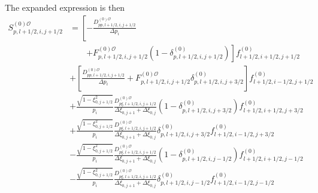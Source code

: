 \begin{itemize}
The expanded expression is then
\begin{align}
S_{p,l+1/2,i,j+1/2}^{\left(  0\right)  \mathcal{O}} &  =\left[  -\frac
{D_{pp,l+1/2,i,j+1/2}^{(0)\mathcal{O}}}{\Delta p_{i}}\right.\nonumber\\&\qquad\left.+F_{p,l+1/2,i,j+1/2}%
^{(0)\mathcal{O}}\left(  1-\delta_{p,l+1/2,i,j+1/2}^{\left(  0\right)
}\right)  \right]  f_{l+1/2,i+1/2,j+1/2}^{\left(  0\right)  }\label{sp0dis}\\
&  +\left[  \frac{D_{pp,l+1/2,i,j+1/2}^{(0)\mathcal{O}}}{\Delta p_{i}%
}+F_{p,l+1/2,i,j+1/2}^{(0)\mathcal{O}}\delta_{p,l+1/2,i,j+3/2}^{\left(
0\right)  }\right]  f_{l+1/2,i-1/2,j+1/2}^{\left(  0\right)  }\nonumber\\
&  +\frac{\sqrt{1-\xi_{0,j+1/2}^{2}}}{p_{i}}\frac{D_{p\xi,l+1/2,i,j+1/2}%
^{(0)\mathcal{O}}}{\Delta\xi_{0,j+1}+\Delta\xi_{0,j}}\left(  1-\delta
_{p,l+1/2,i,j+3/2}^{\left(  0\right)  }\right)  f_{l+1/2,i+1/2,j+3/2}^{\left(
0\right)  }\nonumber\\
&  +\frac{\sqrt{1-\xi_{0,j+1/2}^{2}}}{p_{i}}\frac{D_{p\xi,l+1/2,i,j+1/2}%
^{(0)\mathcal{O}}}{\Delta\xi_{0,j+1}+\Delta\xi_{0,j}}\delta_{p,l+1/2,i,j+3/2}%
^{\left(  0\right)  }f_{l+1/2,i-1/2,j+3/2}^{\left(  0\right)  }\nonumber\\
&  -\frac{\sqrt{1-\xi_{0,j+1/2}^{2}}}{p_{i}}\frac{D_{p\xi,l+1/2,i,j+1/2}%
^{(0)\mathcal{O}}}{\Delta\xi_{0,j+1}+\Delta\xi_{0,j}}\left(  1-\delta
_{p,l+1/2,i,j-1/2}^{\left(  0\right)  }\right)  f_{l+1/2,i+1/2,j-1/2}^{\left(
0\right)  }\nonumber\\
&  -\frac{\sqrt{1-\xi_{0,j+1/2}^{2}}}{p_{i}}\frac{D_{p\xi,l+1/2,i,j+1/2}%
^{(0)\mathcal{O}}}{\Delta\xi_{0,j+1}+\Delta\xi_{0,j}}\delta_{p,l+1/2,i,j-1/2}%
^{\left(  0\right)  }f_{l+1/2,i-1/2,j-1/2}^{\left(  0\right)  }\nonumber
\end{align}


\end{itemize}
